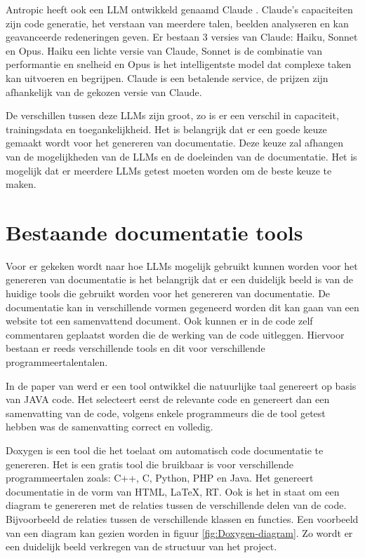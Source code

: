 Antropic heeft ook een LLM ontwikkeld genaamd Claude \autocite{Anthropic2023}. 
Claude's capaciteiten zijn code generatie, het verstaan van meerdere talen, beelden analyseren en kan geavanceerde redeneringen geven.
Er bestaan 3 versies van Claude: Haiku, Sonnet en Opus.
Haiku een lichte versie van Claude, Sonnet is de combinatie van performantie en snelheid en Opus is het intelligentste model dat complexe taken kan uitvoeren en begrijpen.
Claude is een betalende service, de prijzen zijn afhankelijk van de gekozen versie van Claude.

De verschillen tussen deze LLMs zijn groot, zo is er een verschil in capaciteit, trainingsdata en toegankelijkheid.
Het is belangrijk dat er een goede keuze gemaakt wordt voor het genereren van documentatie.
Deze keuze zal afhangen van de mogelijkheden van de LLMs en de doeleinden van de documentatie.
Het is mogelijk dat er meerdere LLMs getest moeten worden om de beste keuze te maken.

\section{Bestaande documentatie tools}
\label{sec:huidige-tools}
Voor er gekeken wordt naar hoe LLMs mogelijk gebruikt kunnen worden voor het genereren van documentatie is het belangrijk dat er een duidelijk beeld is van de huidige tools die gebruikt worden voor het genereren van documentatie.
De documentatie kan in verschillende vormen gegeneerd worden dit kan gaan van een website tot een samenvattend document.
Ook kunnen er in de code zelf commentaren geplaatst worden die de werking van de code uitleggen.
Hiervoor bestaan er reeds verschillende tools en dit voor verschillende programmeertalentalen.

In de paper van \textcite{SridharaEtAL2010} werd er een tool ontwikkel die natuurlijke taal genereert op basis van JAVA code. 
Het selecteert eerst de relevante code en genereert dan een samenvatting van de code, volgens enkele programmeurs die de tool getest hebben was de samenvatting correct en volledig.

Doxygen \autocite{Doxygen2023} is een tool die het toelaat om automatisch code documentatie te genereren. Het is een gratis tool die bruikbaar is voor verschillende programmeertalen zoals: C++, C, Python, PHP en Java.
Het genereert documentatie in de vorm van HTML, LaTeX, RT. Ook is het in staat om een diagram te genereren met de relaties tussen de verschillende delen van de code. 
Bijvoorbeeld de relaties tussen de verschillende klassen en functies.
Een voorbeeld van een diagram kan gezien worden in figuur \ref{fig:Doxygen-diagram}.
Zo wordt er een duidelijk beeld verkregen van de structuur van het project.

